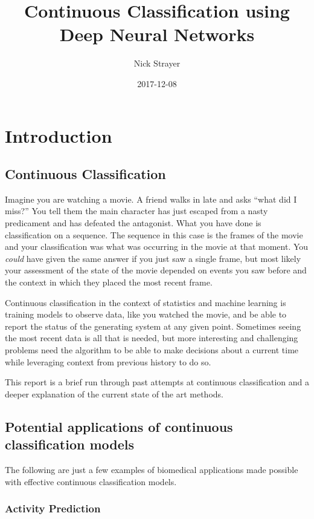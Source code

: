 \documentclass[]{book}
\title{Continuous Classification using Deep Neural Networks}
\author{Nick Strayer}
\date{2017-12-08}
\theoremstyle{definition}
\theoremstyle{definition}
\theoremstyle{definition}
\theoremstyle{remark}
\begin{document}
\maketitle

{
\setcounter{tocdepth}{1}
\tableofcontents
}
\chapter{Introduction}\label{intro}

\section{Continuous Classification}\label{continuous-classification}

Imagine you are watching a movie. A friend walks in late and asks ``what
did I miss?'' You tell them the main character has just escaped from a
nasty predicament and has defeated the antagonist. What you have done is
classification on a sequence. The sequence in this case is the frames of
the movie and your classification was what was occurring in the movie at
that moment. You \emph{could} have given the same answer if you just saw
a single frame, but most likely your assessment of the state of the
movie depended on events you saw before and the context in which they
placed the most recent frame.

Continuous classification in the context of statistics and machine
learning is training models to observe data, like you watched the movie,
and be able to report the status of the generating system at any given
point. Sometimes seeing the most recent data is all that is needed, but
more interesting and challenging problems need the algorithm to be able
to make decisions about a current time while leveraging context from
previous history to do so.

This report is a brief run through past attempts at continuous
classification and a deeper explanation of the current state of the art
methods.

\section{Potential applications of continuous classification
models}\label{potential-applications-of-continuous-classification-models}

The following are just a few examples of biomedical applications made
possible with effective continuous classification models.

\subsection{Activity Prediction}\label{activity-prediction}
\end{document}
